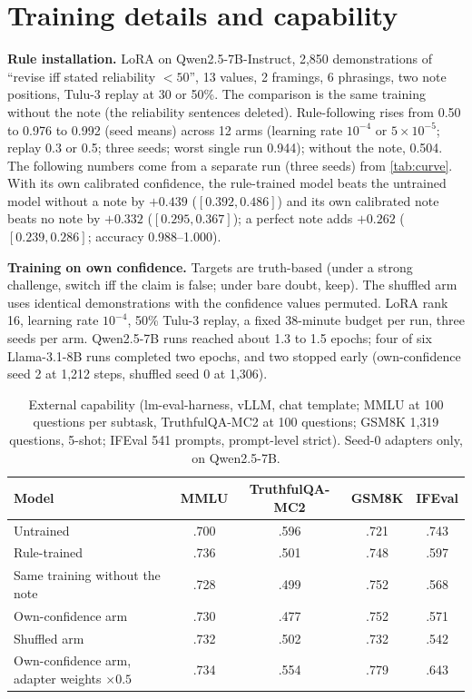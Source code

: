 \documentclass{article} %
\begin{document}
\section{Training details and capability}
\label{app:training}

\textbf{Rule installation.} LoRA on Qwen2.5-7B-Instruct, 2{,}850 demonstrations of ``revise iff stated reliability $<50$'', 13 values, 2 framings, 6 phrasings, two note positions, Tulu-3 replay at 30 or 50\%. The comparison is the same training without the note (the reliability sentences deleted). Rule-following rises from 0.50 to 0.976 to 0.992 (seed means) across 12 arms (learning rate $10^{-4}$ or $5\times10^{-5}$; replay 0.3 or 0.5; three seeds; worst single run 0.944); without the note, 0.504. The following numbers come from a separate run (three seeds) from \cref{tab:curve}. With its own calibrated confidence, the rule-trained model beats the untrained model without a note by $+0.439$ ($[0.392, 0.486]$) and its own calibrated note beats no note by $+0.332$ ($[0.295, 0.367]$); a perfect note adds $+0.262$ ($[0.239, 0.286]$; accuracy 0.988--1.000).

\textbf{Training on own confidence.} Targets are truth-based (under a strong challenge, switch iff the claim is false; under bare doubt, keep). The shuffled arm uses identical demonstrations with the confidence values permuted. LoRA rank 16, learning rate $10^{-4}$, 50\% Tulu-3 replay, a fixed 38-minute budget per run, three seeds per arm. Qwen2.5-7B runs reached about 1.3 to 1.5 epochs; four of six Llama-3.1-8B runs completed two epochs, and two stopped early (own-confidence seed 2 at 1{,}212 steps, shuffled seed 0 at 1{,}306).

\begin{table}[h]
\caption{External capability (lm-eval-harness, vLLM, chat template; MMLU at 100 questions per subtask, TruthfulQA-MC2 at 100 questions; GSM8K 1{,}319 questions, 5-shot; IFEval 541 prompts, prompt-level strict). Seed-0 adapters only, on Qwen2.5-7B.}
\label{tab:capability}
\centering\footnotesize
\begin{tabular}{lcccc}
\toprule
Model & MMLU & TruthfulQA-MC2 & GSM8K & IFEval \\
\midrule
Untrained & .700 & .596 & .721 & .743 \\
Rule-trained & .736 & .501 & .748 & .597 \\
Same training without the note & .728 & .499 & .752 & .568 \\
Own-confidence arm & .730 & .477 & .752 & .571 \\
Shuffled arm & .732 & .502 & .732 & .542 \\
Own-confidence arm, adapter weights $\times0.5$ & .734 & .554 & .779 & .643 \\
\bottomrule
\end{tabular}
\end{table}
\end{document}
